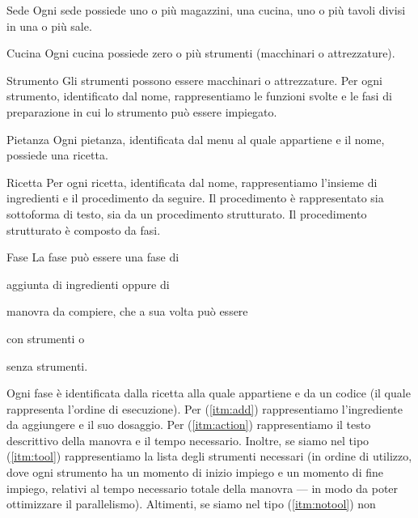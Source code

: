 \begin{center}
\begin{reqtable}{Sede}
Ogni sede possiede uno o più magazzini, una cucina, uno o più tavoli divisi in una
o più sale.
\end{reqtable}
\begin{reqtable}{Cucina}
Ogni cucina possiede zero o più strumenti (macchinari o attrezzature).
\end{reqtable}
\begin{reqtable}{Strumento}
Gli strumenti possono essere macchinari o attrezzature. Per ogni strumento, identificato
dal nome, rappresentiamo le funzioni svolte e le fasi di preparazione in cui lo
strumento può essere impiegato.
\end{reqtable}
\begin{reqtable}{Pietanza}
Ogni pietanza, identificata dal menu al quale appartiene e il nome, possiede una ricetta.
\end{reqtable}
\begin{reqtable}{Ricetta}
Per ogni ricetta, identificata dal nome, rappresentiamo l'insieme di ingredienti
e il procedimento da seguire. Il procedimento è rappresentato sia sottoforma di
testo, sia da un procedimento strutturato. Il procedimento strutturato è composto da fasi.
\end{reqtable}
\begin{reqtable}{Fase}
La fase può essere una fase di
\begin{inparaenum}[a)]
\item \label{itm:add} aggiunta di ingredienti oppure di
\item \label{itm:action} manovra da compiere, che a sua volta può essere
\begin{inparaenum}[i)]
\item \label{itm:tool} con strumenti o
\item \label{itm:notool} senza strumenti.
\end{inparaenum}
\end{inparaenum}
Ogni fase è identificata dalla ricetta alla quale appartiene e da un codice (il
quale rappresenta l'ordine di esecuzione). Per (\ref{itm:add}) rappresentiamo
l'ingrediente da aggiungere e il suo dosaggio. Per (\ref{itm:action}) rappresentiamo
il testo descrittivo della manovra e il tempo necessario. Inoltre, se siamo nel
tipo (\ref{itm:tool}) rappresentiamo la lista degli strumenti necessari (in ordine
di utilizzo, dove ogni strumento ha un momento di inizio impiego e un momento di
fine impiego, relativi al tempo necessario totale della manovra --- in modo da poter
ottimizzare il parallelismo). Altimenti, se siamo nel tipo (\ref{itm:notool}) non

\end{reqtable}
\end{center}
